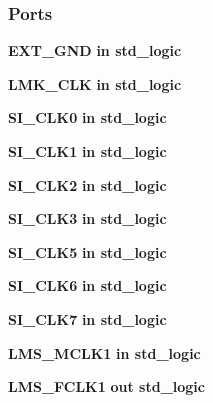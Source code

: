 \subsubsection*{Ports}
 \begin{DoxyCompactItemize}
\item 
{\bf E\+X\+T\+\_\+\+G\+ND}  {\bfseries {\bfseries \textcolor{keywordflow}{in}\textcolor{vhdlchar}{ }}} {\bfseries \textcolor{comment}{std\+\_\+logic}\textcolor{vhdlchar}{ }} 
\item 
{\bf L\+M\+K\+\_\+\+C\+LK}  {\bfseries {\bfseries \textcolor{keywordflow}{in}\textcolor{vhdlchar}{ }}} {\bfseries \textcolor{comment}{std\+\_\+logic}\textcolor{vhdlchar}{ }} 
\item 
{\bf S\+I\+\_\+\+C\+L\+K0}  {\bfseries {\bfseries \textcolor{keywordflow}{in}\textcolor{vhdlchar}{ }}} {\bfseries \textcolor{comment}{std\+\_\+logic}\textcolor{vhdlchar}{ }} 
\item 
{\bf S\+I\+\_\+\+C\+L\+K1}  {\bfseries {\bfseries \textcolor{keywordflow}{in}\textcolor{vhdlchar}{ }}} {\bfseries \textcolor{comment}{std\+\_\+logic}\textcolor{vhdlchar}{ }} 
\item 
{\bf S\+I\+\_\+\+C\+L\+K2}  {\bfseries {\bfseries \textcolor{keywordflow}{in}\textcolor{vhdlchar}{ }}} {\bfseries \textcolor{comment}{std\+\_\+logic}\textcolor{vhdlchar}{ }} 
\item 
{\bf S\+I\+\_\+\+C\+L\+K3}  {\bfseries {\bfseries \textcolor{keywordflow}{in}\textcolor{vhdlchar}{ }}} {\bfseries \textcolor{comment}{std\+\_\+logic}\textcolor{vhdlchar}{ }} 
\item 
{\bf S\+I\+\_\+\+C\+L\+K5}  {\bfseries {\bfseries \textcolor{keywordflow}{in}\textcolor{vhdlchar}{ }}} {\bfseries \textcolor{comment}{std\+\_\+logic}\textcolor{vhdlchar}{ }} 
\item 
{\bf S\+I\+\_\+\+C\+L\+K6}  {\bfseries {\bfseries \textcolor{keywordflow}{in}\textcolor{vhdlchar}{ }}} {\bfseries \textcolor{comment}{std\+\_\+logic}\textcolor{vhdlchar}{ }} 
\item 
{\bf S\+I\+\_\+\+C\+L\+K7}  {\bfseries {\bfseries \textcolor{keywordflow}{in}\textcolor{vhdlchar}{ }}} {\bfseries \textcolor{comment}{std\+\_\+logic}\textcolor{vhdlchar}{ }} 
\item 
{\bf L\+M\+S\+\_\+\+M\+C\+L\+K1}  {\bfseries {\bfseries \textcolor{keywordflow}{in}\textcolor{vhdlchar}{ }}} {\bfseries \textcolor{comment}{std\+\_\+logic}\textcolor{vhdlchar}{ }} 
\item 
{\bf L\+M\+S\+\_\+\+F\+C\+L\+K1}  {\bfseries {\bfseries \textcolor{keywordflow}{out}\textcolor{vhdlchar}{ }}} {\bfseries \textcolor{comment}{std\+\_\+logic}\textcolor{vhdlchar}{ }} 

\end{DoxyCompactItemize}
